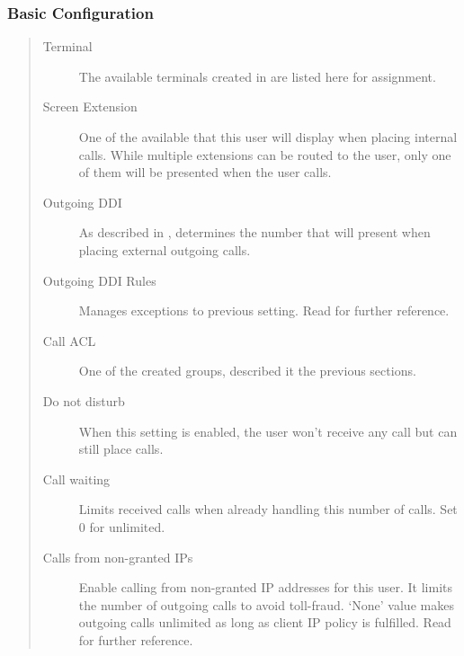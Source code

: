 \documentclass[letterpaper,10pt,english]{sphinxmanual}
\begin{document}
\subsubsection{Basic Configuration}
\label{administration_portal/client/vpbx/users:basic-configuration}\begin{quote}
\begin{description}
\item[{Terminal}] \leavevmode
The available terminals created in {\hyperref[administration_portal/client/vpbx/terminals:terminals]{}} are listed here
for assignment.

\item[{Screen Extension}] \leavevmode
One of the available {\hyperref[administration_portal/client/vpbx/extensions:extensions]{}} that this user will display when
placing internal calls. While multiple extensions can be routed to the
user, only one of them will be presented when the user calls.

\item[{Outgoing DDI}] \leavevmode
As described in {\hyperref[getting_started/external_outgoing_calls/outgoing_ddi:external\string-ddi]{}}, determines the number that will
present when placing external outgoing calls.

\item[{Outgoing DDI Rules}] \leavevmode
Manages exceptions to previous setting. Read {\hyperref[administration_portal/client/vpbx/user_configuration/outgoing_ddi_rules:outgoingddi\string-rules]{}}
for further reference.

\item[{Call ACL}] \leavevmode
One of the created {\hyperref[administration_portal/client/vpbx/user_configuration/call_acls:call\string-permissions]{}} groups, described
it the previous sections.

\item[{Do not disturb}] \leavevmode
When this setting is enabled, the user won't receive any call but can
still place calls.

\item[{Call waiting}] \leavevmode
Limits received calls when already handling this number of calls. Set 0 for unlimited.

\item[{Calls from non-granted IPs}] \leavevmode
Enable calling from non-granted IP addresses for this user.
It limits the number of outgoing calls to avoid toll-fraud.
`None' value makes outgoing calls unlimited as long as client IP
policy is fulfilled. Read {\hyperref[security_and_maintenance/security/authorized_ip_ranges:roadwarrior\string-users]{}} for further reference.


\end{description}
\end{quote}
\end{document}
